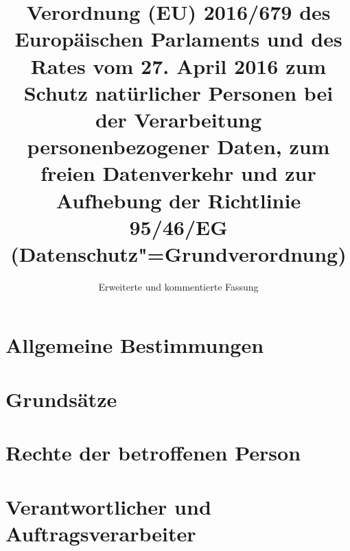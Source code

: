 

\title{Verordnung (EU) 2016/679 des Europäischen Parlaments und des Rates vom 27. April 2016 zum Schutz natürlicher
 Personen bei der Verarbeitung personenbezogener Daten, zum freien Datenverkehr und zur Aufhebung der Richtlinie
 95/46/EG (Datenschutz"=Grundverordnung)}
\subtitle{Erweiterte und kommentierte Fassung}


\frontmatter
\maketitle
\tableofcontents



\mainmatter
\part{Allgemeine Bestimmungen}
\label{part:1}





\part{Grundsätze}
\label{part:2}








\part{Rechte der betroffenen Person}
\label{part:3}


















\part{Verantwortlicher und Auftragsverarbeiter}
\label{part:4}

